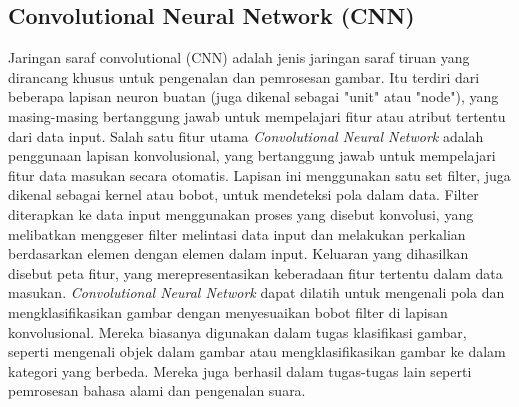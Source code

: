 \subsection{Convolutional Neural Network (CNN)}

Jaringan saraf convolutional (CNN) adalah jenis jaringan saraf tiruan yang dirancang khusus untuk pengenalan dan pemrosesan gambar. Itu terdiri dari beberapa lapisan neuron buatan 
(juga dikenal sebagai "unit" atau "node"), yang masing-masing bertanggung jawab untuk mempelajari fitur atau atribut tertentu dari data input. Salah satu fitur utama \emph{Convolutional Neural Network} adalah penggunaan
lapisan konvolusional, yang bertanggung jawab untuk mempelajari fitur data masukan secara otomatis. Lapisan ini menggunakan satu set filter, juga dikenal sebagai kernel atau bobot, 
untuk mendeteksi pola dalam data. Filter diterapkan ke data input menggunakan proses yang disebut konvolusi, yang melibatkan menggeser filter melintasi data input dan melakukan perkalian 
berdasarkan elemen dengan elemen dalam input. Keluaran yang dihasilkan disebut peta fitur, yang merepresentasikan keberadaan fitur tertentu dalam data masukan. \emph{Convolutional Neural Network} dapat dilatih untuk 
mengenali pola dan mengklasifikasikan gambar dengan menyesuaikan bobot filter di lapisan konvolusional. Mereka biasanya digunakan dalam tugas klasifikasi gambar, seperti mengenali objek 
dalam gambar atau mengklasifikasikan gambar ke dalam kategori yang berbeda. Mereka juga berhasil dalam tugas-tugas lain seperti pemrosesan bahasa alami dan pengenalan suara.


